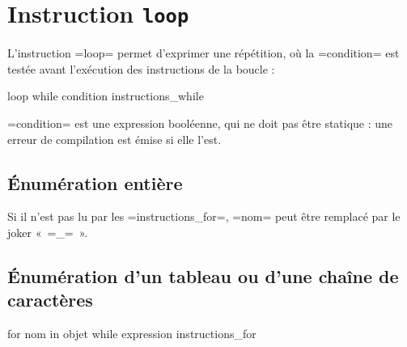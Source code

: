 \section{Instruction \texttt{loop}}

L'instruction \plm=loop= permet d'exprimer une répétition, où la \plm=condition= est testée avant l'exécution des instructions de la boucle :
\begin{PLM}
loop while condition {
  instructions_while
}
\end{PLM}

\plm=condition= est une expression booléenne, qui ne doit pas être statique : une erreur de compilation est émise si elle l'est.














\subsection{Énumération entière}

Si il n'est pas lu par les \plm=instructions_for=, \plm=nom= peut être remplacé par le joker « \plm=_= ».




\subsection{Énumération d'un tableau ou d'une chaîne de caractères}

\begin{PLM}
for nom in objet while expression {
  instructions_for
}
\end{PLM}







































